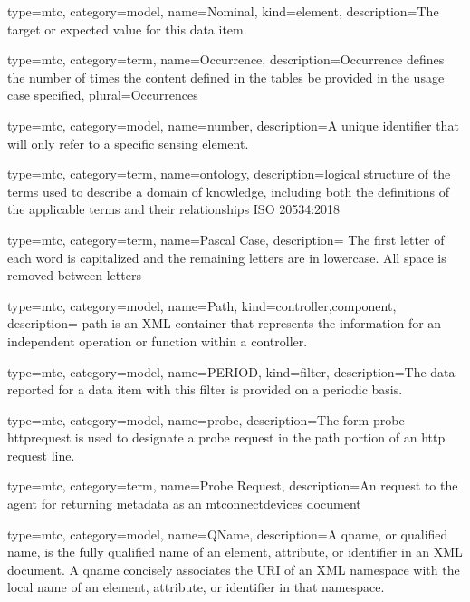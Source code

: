 {
  type=mtc,
  category=model,
  name={Nominal},
  kind={element},
  description={The target or expected value for this data item.}
}


{
  type=mtc,
  category=term,
  name={Occurrence},
  description={Occurrence defines the number of times the content defined in the tables \MAY be provided in the usage case specified},
  plural={Occurrences}
}


{
  type=mtc,
  category=model,
  name={number},
  description={A unique identifier that will only refer to a specific \gls{sensing element}.}
}


{
  type=mtc,
  category=term,
  name={ontology},
  description={logical structure of the terms used to describe a domain of knowledge, including both the definitions of the applicable terms and their relationships ISO 20534:2018}
}


{
  type=mtc,
  category=term,
  name={Pascal Case},
  description= {The first letter of each word is capitalized and the remaining letters are in lowercase. All space is removed between letters}
}


{
  type=mtc,
  category=model,
  name={Path},
  kind={controller,component},
  description= {\gls{path} is an XML container that represents the information for an independent operation or function within a \gls{controller}.}
}


{
  type=mtc,
  category=model,
  name={PERIOD},
  kind={filter},
  description={The data reported for a data item with this \gls{filter} is provided on a periodic basis.}
}



{
  type=mtc,
  category=model,
  name={probe},
  description={The form \gls{probe httprequest} is used to designate a \gls{probe request} in the path portion of an \gls{http request line}.}
}


{
  type=mtc,
  category=term,
  name={Probe Request},
  description={An  request to the \gls{agent} for returning metadata as an \gls{mtconnectdevices}  document}
}


{
  type=mtc,
  category=model,
  name={QName},
  description={A \gls{qname}, or qualified name, is the fully qualified name of an element, attribute, or identifier in an XML document. A  \gls{qname} concisely associates the URI of an XML namespace with the local name of an element, attribute, or identifier in that namespace.}
}


